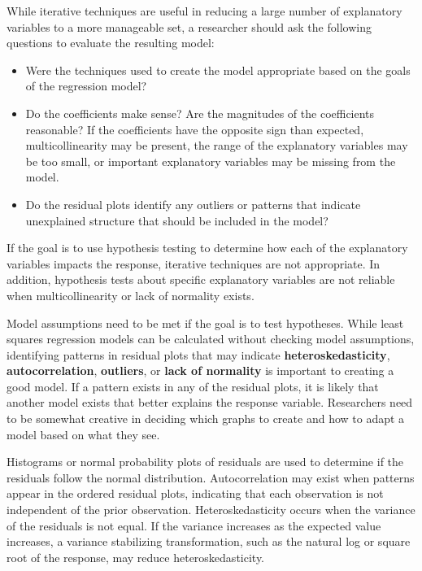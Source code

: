 \documentclass[
]{report}
\begin{document}
While iterative techniques are useful in reducing a large number of explanatory variables to a more manageable set, a researcher should ask the following questions to evaluate the resulting model:

\vspace{-1em}
\begin{itemize}
\item Were the techniques used to create the model appropriate based on the goals of the regression model?
\item Do the coefficients make sense? Are the magnitudes of the coefficients reasonable? If the coefficients have the opposite sign than expected, multicollinearity may be present, the range of the explanatory variables may be too small, or important explanatory variables may be missing from the model.
\item Do the residual plots identify any outliers or patterns that indicate unexplained structure that should be included in the model?
\end{itemize}

If the goal is to use hypothesis testing to determine how each of the explanatory variables impacts the response, iterative techniques are not appropriate. In addition, hypothesis tests about specific explanatory variables are not reliable when multicollinearity or lack of normality exists.

Model assumptions need to be met if the goal is to test hypotheses. While least squares regression models can be calculated without checking model assumptions, identifying patterns in residual plots that may indicate \textbf{heteroskedasticity}, \textbf{autocorrelation}, \textbf{outliers}, or \textbf{lack of normality} is important to creating a good model. If a pattern exists in any of the residual plots, it is likely that another model exists that better explains the response variable. Researchers need to be somewhat creative in deciding which graphs to create and how to adapt a model based on what they see.

Histograms or normal probability plots of residuals are used to determine if the residuals follow the normal distribution. Autocorrelation may exist when patterns appear in the ordered residual plots, indicating that each observation is not independent of the prior observation. Heteroskedasticity occurs when the variance of the residuals is not equal. If the variance increases as the expected value increases, a variance stabilizing transformation, such as the natural log or square root of the response, may reduce heteroskedasticity.
\end{document}
